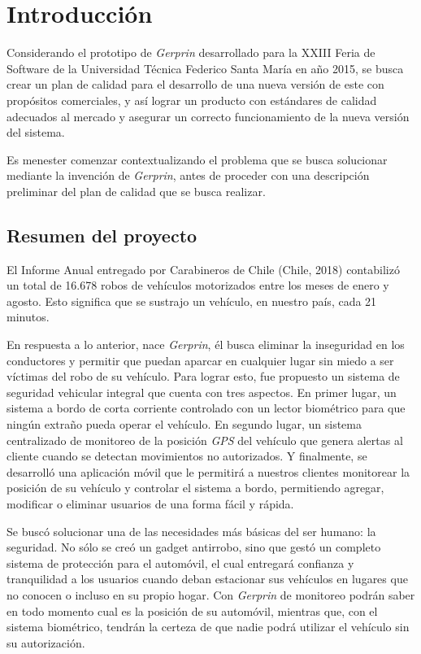 
\chapter{Introducción}
Considerando el prototipo de \textit{Gerprin} desarrollado para la XXIII Feria de Software de la Universidad Técnica Federico Santa María en año 2015, se busca crear un plan de calidad para el desarrollo de una nueva versión de este con propósitos comerciales, y así lograr un producto con estándares de calidad adecuados al mercado y asegurar un correcto funcionamiento de la nueva versión del sistema.

Es menester comenzar contextualizando el problema que se busca solucionar mediante la invención de \textit{Gerprin}, antes de proceder con una descripción preliminar del plan de calidad que se busca realizar. 

\section{Resumen del proyecto}

El Informe Anual entregado por Carabineros de Chile (Chile, 2018) contabilizó un total de 16.678 robos de vehículos motorizados entre los meses de enero y agosto. Esto significa que se sustrajo un vehículo, en nuestro país, cada 21 minutos.

En respuesta a lo anterior, nace \textit{Gerprin}, él busca eliminar la inseguridad en los conductores y permitir que puedan aparcar en cualquier lugar sin miedo a ser víctimas del robo de su vehículo. Para lograr esto, fue propuesto un sistema de seguridad vehicular integral que cuenta con tres aspectos. En primer lugar, un sistema a bordo de corta corriente controlado con un lector biométrico para que ningún extraño pueda operar el vehículo. En segundo lugar, un sistema centralizado de monitoreo de la posición \textit{GPS} del vehículo que genera alertas al cliente cuando se detectan movimientos no autorizados. Y finalmente, se desarrolló una aplicación móvil que le permitirá a nuestros clientes monitorear la posición de su vehículo y controlar el sistema a bordo, permitiendo agregar, modificar o eliminar usuarios de una forma fácil y rápida.

 Se buscó solucionar una de las necesidades más básicas del ser humano: la seguridad. No sólo se creó un gadget antirrobo, sino que gestó un completo sistema de protección para el automóvil, el cual entregará confianza y tranquilidad a los usuarios cuando deban estacionar sus vehículos en lugares que no conocen o incluso en su propio hogar. Con \textit{Gerprin} de monitoreo podrán saber en todo momento cual es la posición de su automóvil, mientras que, con el sistema biométrico, tendrán la certeza de que nadie podrá utilizar el vehículo sin su autorización.

